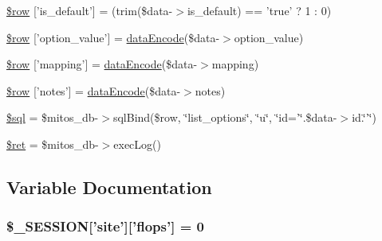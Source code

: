 \begin{DoxyCompactItemize}
\item 
\hyperlink{administration_2lists_2data__update_8ejs_8php_afb2c758deaface994a3fbc212ded12cd}{\$row} \mbox{[}'is\-\_\-default'\mbox{]} = (trim(\$data-\/$>$is\-\_\-default) == 'true' ? 1 \-: 0)
\item 
\hyperlink{administration_2lists_2data__update_8ejs_8php_a48eb30eb1a910d28f11f62cf48b97401}{\$row} \mbox{[}'option\-\_\-value'\mbox{]} = \hyperlink{data_exchange_8class_8php_a18220e6e744fcb46d788ed8b03b85f62}{data\-Encode}(\$data-\/$>$option\-\_\-value)
\item 
\hyperlink{administration_2lists_2data__update_8ejs_8php_ad4c649a633b36e8ca62f63391a3279a6}{\$row} \mbox{[}'mapping'\mbox{]} = \hyperlink{data_exchange_8class_8php_a18220e6e744fcb46d788ed8b03b85f62}{data\-Encode}(\$data-\/$>$mapping)
\item 
\hyperlink{administration_2lists_2data__update_8ejs_8php_a6cd140f95df717cfed217fe478482645}{\$row} \mbox{[}'notes'\mbox{]} = \hyperlink{data_exchange_8class_8php_a18220e6e744fcb46d788ed8b03b85f62}{data\-Encode}(\$data-\/$>$notes)
\item 
\hyperlink{administration_2lists_2data__update_8ejs_8php_a047170d6020a882807665812a27e2525}{\$sql} = \$mitos\-\_\-db-\/$>$sql\-Bind(\$row, \char`\"{}list\-\_\-options\char`\"{}, \char`\"{}u\char`\"{}, \char`\"{}id='\char`\"{}.\$data-\/$>$id.\char`\"{}'\char`\"{})
\item 
\hyperlink{administration_2lists_2data__update_8ejs_8php_affd9e3eb0aad0a7ca42912cd925f148c}{\$ret} = \$mitos\-\_\-db-\/$>$exec\-Log()
\end{DoxyCompactItemize}


\subsection{\-Variable \-Documentation}
\hypertarget{administration_2lists_2data__update_8ejs_8php_a99fda8552a3e58235643b79f5af3ded8}{
\subsubsection[{\$\-\_\-\-S\-E\-S\-S\-I\-O\-N}]{\setlength{\rightskip}{0pt plus 5cm}\$\-\_\-\-S\-E\-S\-S\-I\-O\-N\mbox{[}'site'\mbox{]}\mbox{[}'flops'\mbox{]} = 0}}\label{administration_2lists_2data__update_8ejs_8php_a99fda8552a3e58235643b79f5af3ded8}


